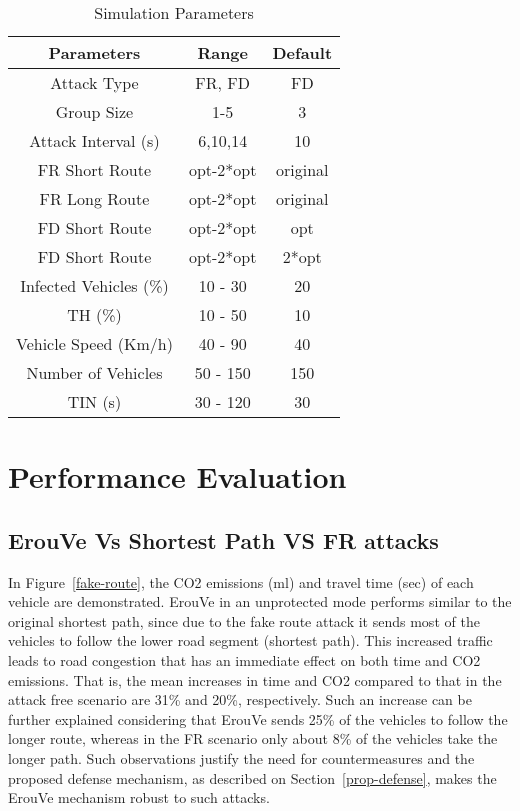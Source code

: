 \documentclass[conference]{IEEEtran}
\begin{document}
\begin{table}[!htb]
\centering
\caption{Simulation Parameters}
\begin{tabular}{|c|c|c|}
\hline
{\bf Parameters}     & {\bf Range} & {\bf Default} \\ \hline
Attack Type          & FR, FD      & FD            \\ \hline
Group Size           & 1-5         & 3             \\ \hline
Attack Interval (s)  & 6,10,14     & 10            \\ \hline
FR Short Route       & opt-2*opt   & original           \\ \hline
FR Long Route        & opt-2*opt   & original           \\ \hline
FD Short Route       & opt-2*opt   & opt           \\ \hline
FD Short Route       & opt-2*opt   & 2*opt         \\ \hline
Infected Vehicles (\%)   & 10 - 30      &   20           \\ \hline
TH (\%) & 10 -  50      & 10           \\ \hline
Vehicle Speed (Km/h) &40 - 90       & 40            \\ \hline
Number of Vehicles   & 50 - 150      & 150           \\ \hline
TIN (s)   & 30 - 120      & 30           \\ \hline
\end{tabular}
\label{params}
\end{table}

\section{Performance Evaluation}
\label{perf-eval}

\subsection{ErouVe Vs Shortest Path VS FR attacks}

In Figure~\ref{fake-route}, the CO2 emissions (ml) and travel time (sec) of each vehicle are demonstrated.
ErouVe in an unprotected mode performs similar to the original shortest path, since due to the
fake route attack it sends most of the vehicles to follow the lower road segment (shortest path).
This increased traffic leads to road congestion that has an immediate effect on both time and CO2 emissions. That is, the mean increases in time and CO2 compared to that in the attack free scenario are 31\% and 20\%, respectively.
Such an increase can be further explained considering that ErouVe sends 25\% of the vehicles to follow the longer route, whereas in the FR scenario only about 8\% of the vehicles take the longer path.
Such observations justify the need for countermeasures and the proposed defense mechanism, 
as described on Section~\ref{prop-defense}, makes the ErouVe mechanism robust to such attacks.
\end{document}
